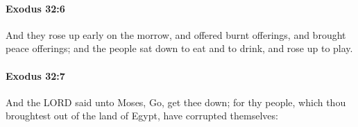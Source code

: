 		\paragraph{Exodus 32:6} %
			\label{EXODUS-32-6}

			And they rose up early on the morrow, and offered burnt offerings, and brought peace offerings; and the people sat down to eat and to drink, and rose up to play.


		\paragraph{Exodus 32:7} %
			\label{EXODUS-32-7}

			And the LORD said unto Moses, Go, get thee down; for thy people, which thou broughtest out of the land of Egypt, have corrupted themselves:


